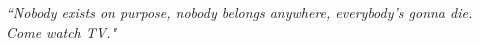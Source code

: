
\begin{dedication} %

\large\emph{``Nobody exists on purpose, nobody belongs anywhere, everybody's gonna die. Come watch TV."}

\end{dedication}

